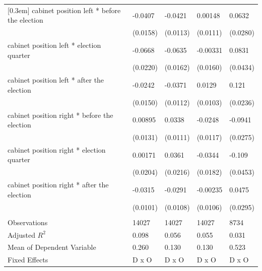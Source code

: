 \documentclass[a4paper,12pt]{article}
\newcommand{\sym}[1]{\rlap{#1}}
\begin{document}
\begin{table}[htbp]
\begin{tabularx}{\textwidth}{l*{4}{Y}}
[0.3em]
cabinet position left * before the election&   -0.0407\sym{*}  &   -0.0421\sym{***}&   0.00148         &    0.0632\sym{*}  \\
                                        &  (0.0158)         &  (0.0113)         &  (0.0111)         &  (0.0280)         \\
[0.3em]
cabinet position left * election quarter&   -0.0668\sym{**} &   -0.0635\sym{***}&  -0.00331         &    0.0831         \\
                                        &  (0.0220)         &  (0.0162)         &  (0.0160)         &  (0.0434)         \\
[0.3em]
cabinet position left * after the election&   -0.0242         &   -0.0371\sym{**} &    0.0129         &     0.121\sym{***}\\
                                        &  (0.0150)         &  (0.0112)         &  (0.0103)         &  (0.0236)         \\
[0.3em]
cabinet position right * before the election&   0.00895         &    0.0338\sym{**} &   -0.0248\sym{*}  &   -0.0941\sym{**} \\
                                        &  (0.0131)         &  (0.0111)         &  (0.0117)         &  (0.0275)         \\
[0.3em]
cabinet position right * election quarter&   0.00171         &    0.0361         &   -0.0344         &    -0.109\sym{*}  \\
                                        &  (0.0204)         &  (0.0216)         &  (0.0182)         &  (0.0453)         \\
[0.3em]
cabinet position right * after the election&   -0.0315\sym{**} &   -0.0291\sym{*}  &  -0.00235         &    0.0475         \\
                                        &  (0.0101)         &  (0.0108)         &  (0.0106)         &  (0.0295)         \\
&\\
\hline
Observations                            &     14027         &     14027         &     14027         &      8734         \\
Adjusted \(R^{2}\)                      &     0.098         &     0.056         &     0.055         &     0.031         \\
Mean of Dependent Variable              &     0.260         &     0.130         &     0.130         &     0.523         \\
Fixed Effects                           &     D x O         &     D x O         &     D x O         &     D x O         \\

\end{tabularx}
\end{table}
\end{document}

